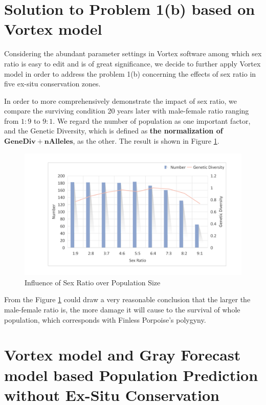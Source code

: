 \documentclass{mcmthesis}
\numberwithin{figure}{section}
\numberwithin{table}{section}
\numberwithin{equation}{section}
\begin{document}
\section{Solution to Problem 1(b) based on Vortex model}
Considering the abundant parameter settings in Vortex software among which sex ratio 
is easy to edit and is of great significance, we decide to further apply Vortex model
in order to address the problem 1(b) concerning the effects of sex ratio in five ex-situ
conservation zones.
\par
In order to more comprehensively demonstrate the impact of sex ratio, 
we compare the surviving condition 20 years later with male-female ratio ranging 
from $ 1:9 $ to $ 9:1 $. We regard the number of population as one important
factor, and the Genetic Diversity, which is defined as \textbf{the normalization of}
$ \bm{GeneDiv + nAlleles} $, as the other. The result is shown in Figure \ref{Sex-Pop}.  
\begin{figure}[htbp]
  \centering
  \includegraphics*[width = 12cm]{codes/Influence.pdf}
  \caption{Influence of Sex Ratio over Population Size}\label{Sex-Pop}
\end{figure}

From the Figure \ref{Sex-Pop} could draw a very reasonable conclusion that
the larger the male-female ratio is, the more damage it will cause to the
survival of whole population, which corresponds with Finless Porpoise's 
polygyny. 

\section{Vortex model and Gray Forecast model based
Population Prediction without Ex-Situ Conservation}
\end{document}
